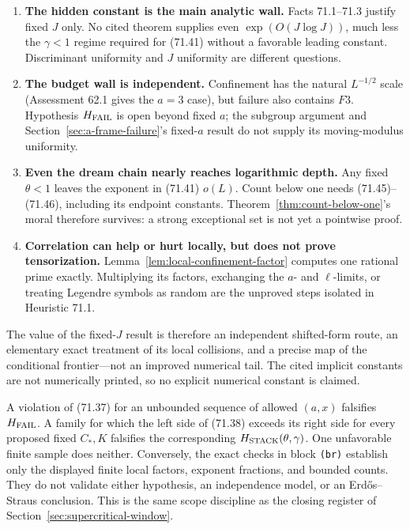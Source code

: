 \documentclass[10pt,reqno]{amsart}
\theoremstyle{definition}
\newcommand{\1}{\mathbf 1}
\begin{document}
\begin{enumerate}[leftmargin=*]
\item \textbf{The hidden constant is the main analytic wall.}  Facts 71.1--71.3
   justify fixed $J$ only.  No cited theorem supplies even
   $\exp(O(J\log J))$, much less the $\gamma<1$ regime required for
   (71.41) without a favorable leading constant.  Discriminant uniformity
   and $J$ uniformity are different questions.
\item \textbf{The budget wall is independent.}  Confinement has the natural
   $L^{-1/2}$ scale (Assessment 62.1 gives the $a=3$ case), but failure
   also contains $F3$.  Hypothesis $H_{\rm FAIL}$ is open beyond fixed
   $a$; the subgroup argument and Section~\ref{sec:a-frame-failure}'s fixed-$a$ result do not supply its
   moving-modulus uniformity.
\item \textbf{Even the dream chain nearly reaches logarithmic depth.}  Any fixed
   $\theta<1$ leaves the exponent in (71.41) $o(L)$.  Count below one
   needs (71.45)--(71.46), including its endpoint constants.  Theorem~\ref{thm:count-below-one}'s
   moral therefore survives: a strong exceptional set is not yet a
   pointwise proof.
\item \textbf{Correlation can help or hurt locally, but does not prove tensorization.}
   Lemma~\ref{lem:local-confinement-factor} computes one rational prime exactly.  Multiplying its factors,
   exchanging the $a$- and $\ell$-limits, or treating Legendre symbols
   as random are the unproved steps isolated in Heuristic 71.1.
\end{enumerate}

The value of the fixed-$J$ result is therefore an independent shifted-form
route, an elementary exact treatment of its local collisions, and a precise
map of the conditional frontier---not an improved numerical tail.  The cited
implicit constants are not numerically printed, so no explicit numerical
constant is claimed.

A violation of (71.37) for an unbounded sequence of allowed $(a,x)$
falsifies $H_{\rm FAIL}$.  A family for which the left side of (71.38)
exceeds its right side for every proposed fixed $C_*,K$ falsifies the
corresponding $H_{\rm STACK}(\theta,\gamma)$.  One unfavorable finite
sample does neither.  Conversely, the exact checks in block \texttt{(br)} establish
only the displayed finite local factors, exponent fractions, and bounded
counts.  They do not validate either hypothesis, an independence model, or
an Erd\H{o}s--Straus conclusion.  This is the same scope discipline as the
closing register of Section~\ref{sec:supercritical-window}.
\end{document}
